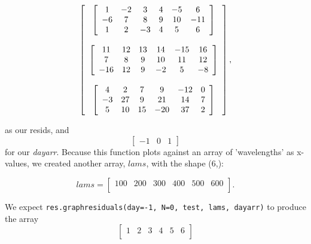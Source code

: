 \documentclass{article}
\begin{document}
\[ \left[ \begin{array}[c]{c}
    
    \left[ \begin{array}[c]{cccccc}
        1 & -2 & 3 & 4 & -5 & 6 \\
        -6 & 7 & 8 & 9 & 10 & -11 \\
        1 & 2 & -3 & 4 & 5 & 6
        \end{array} \right] \\

      \\

    \left[ \begin{array}[c]{cccccc}
        11 & 12 & 13 & 14 & -15 & 16 \\
        7 & 8 & 9 & 10 & 11 & 12 \\
        -16 & 12 & 9 & -2 & 5 & -8 \\
        \end{array} \right] \\

      \\

    \left[ \begin{array}[c]{cccccc}
        4 & 2 & 7 & 9 & -12 & 0 \\
        -3 & 27 & 9 & 21 & 14 & 7 \\
        5 & 10 & 15 & -20 & 37 & 2 \\
    \end{array} \right]

\end{array} \right], \]

as our resids, and \[\left[\begin{array}{ccc} -1 & 0 &
    1 \end{array}\right] \] for our \textit{dayarr}.  Because this
function plots against an array of 'wavelengths' as x-values, we
created another array, $lams$, with the shape (6,):

\[ lams= \left[ \begin{array}{cccccc}
    100 & 200 & 300 & 400 & 500 & 600 \\
\end{array} \right]. \]

We expect \verb|res.graphresiduals(day=-1, N=0, test, lams, dayarr)|
to produce the array
\[ \left[ \begin{array}{cccccc}
1 & 2 & 3 & 4 & 5 & 6 \\
\end{array} \right] \]
\end{document}

